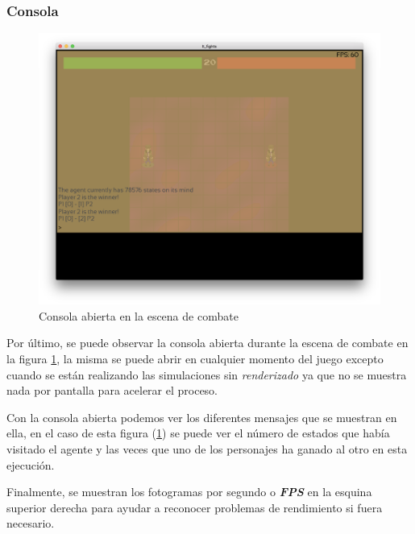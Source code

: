 \subsubsection{Consola}

\begin{figure}[h]
	\centerline{\includegraphics[width=17cm]{otros/manual/consola.png}}
	\caption{Consola abierta en la escena de combate}
	\label{uso:consola}
\end{figure}

Por último, se puede observar la consola abierta durante la escena de combate en la figura \ref{uso:consola}, la misma se puede abrir en cualquier momento del juego excepto cuando se están realizando las simulaciones sin \textit{renderizado} ya que no se muestra nada por pantalla para acelerar el proceso.

\bigskip

Con la consola abierta podemos ver los diferentes mensajes que se muestran en ella, en el caso de esta figura (\ref{uso:consola}) se puede ver el número de estados que había visitado el agente y las veces que uno de los personajes ha ganado al otro en esta ejecución.

\bigskip

Finalmente, se muestran los fotogramas por segundo o \textbf{\textit{FPS}} en la esquina superior derecha para ayudar a reconocer problemas de rendimiento si fuera necesario.



